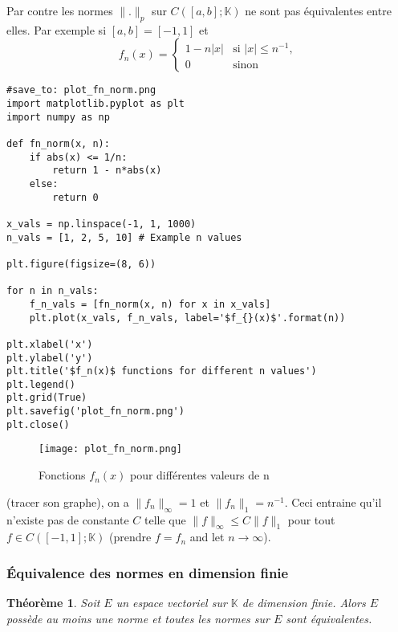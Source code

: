 \documentclass{article}
\newtheorem{theorem}{Théorème}
\begin{document}
Par contre les normes $\|.\|_p$ sur $C([a, b]; \mathbb{K})$ ne sont pas équivalentes entre elles. Par exemple si $[a, b] = [-1, 1]$ et
\begin{equation}
    f_n(x) =
    \begin{cases}
        1 - n|x| & \text{si } |x| \leq n^{-1}, \\
        0 & \text{sinon}
    \end{cases}
\end{equation}
\begin{verbatim}
#save_to: plot_fn_norm.png
import matplotlib.pyplot as plt
import numpy as np

def fn_norm(x, n):
    if abs(x) <= 1/n:
        return 1 - n*abs(x)
    else:
        return 0

x_vals = np.linspace(-1, 1, 1000)
n_vals = [1, 2, 5, 10] # Example n values

plt.figure(figsize=(8, 6))

for n in n_vals:
    f_n_vals = [fn_norm(x, n) for x in x_vals]
    plt.plot(x_vals, f_n_vals, label='$f_{}(x)$'.format(n))

plt.xlabel('x')
plt.ylabel('y')
plt.title('$f_n(x)$ functions for different n values')
plt.legend()
plt.grid(True)
plt.savefig('plot_fn_norm.png')
plt.close()

\end{verbatim}

\begin{figure}[h]
    \centering
    \texttt{[image: plot\_fn\_norm.png]}
    \caption{Fonctions $f_n(x)$ pour différentes valeurs de n}
    \label{fig:plot_fn_norm}
\end{figure}
(tracer son graphe), on a $\|f_n\|_\infty = 1$ et $\|f_n\|_1 = n^{-1}$. Ceci entraine qu'il n'existe pas de constante $C$ telle que $\|f\|_\infty \leq C \|f\|_1$ pour tout $f \in C([-1, 1]; \mathbb{K})$ (prendre $f=f_n$ and let $n \rightarrow \infty$).

\subsubsection{Équivalence des normes en dimension finie}

\begin{theorem}
\label{thm:norm_equiv_finite_dim}
Soit $E$ un espace vectoriel sur $\mathbb{K}$ de dimension finie. Alors $E$ possède au moins une norme et toutes les normes sur $E$ sont équivalentes.
\end{theorem}
\end{document}
